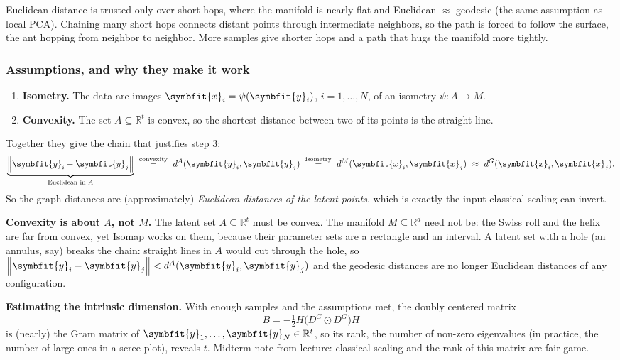 \documentclass[11pt]{article}
\newcommand{\bm}[1]{\symbfit{#1}}
\newcommand{\R}{\mathbb{R}}
\newcommand{\vx}{\bm{x}}
\newcommand{\norm}[1]{\left\lVert #1\right\rVert}
\newcommand{\had}{\odot}
\begin{document}
\begin{intuition}
Euclidean distance is trusted only over short hops, where the manifold is nearly flat and Euclidean $\approx$ geodesic
(the same assumption as local PCA). Chaining many short hops connects distant points through intermediate
neighbors, so the path is forced to follow the surface, the ant hopping from neighbor to neighbor. More samples
give shorter hops and a path that hugs the manifold more tightly.
\end{intuition}

\subsubsection*{Assumptions, and why they make it work}

\begin{enumerate}[label=\arabic*)]
\item \textbf{Isometry.} The data are images $\vx_i=\psi(\bm y_i)$, $i=1,\dots,N$, of an isometry $\psi:A\to M$.
\item \textbf{Convexity.} The set $A\subseteq\R^t$ is convex, so the shortest distance between two of its points is the straight line.
\end{enumerate}
Together they give the chain that justifies step 3:
\[
\underbrace{\norm{\bm y_i-\bm y_j}}_{\text{Euclidean in }A}\ \overset{\text{convexity}}{=}\ d^A(\bm y_i,\bm y_j)\ \overset{\text{isometry}}{=}\ d^M(\vx_i,\vx_j)\ \approx\ d^G(\vx_i,\vx_j) .
\]
So the graph distances are (approximately) \emph{Euclidean distances of the latent points}, which is exactly the input classical
scaling can invert.

\begin{careful}
\textbf{Convexity is about $A$, not $M$.} The latent set $A\subseteq\R^t$ must be convex. The manifold $M\subseteq\R^d$ need not be: the Swiss
roll and the helix are far from convex, yet Isomap works on them, because their parameter sets are a rectangle and an
interval. A latent set with a hole (an annulus, say) breaks the chain: straight lines in $A$ would cut through the
hole, so $\norm{\bm y_i-\bm y_j}<d^A(\bm y_i,\bm y_j)$ and the geodesic distances are no longer Euclidean distances of any configuration.
\end{careful}

\textbf{Estimating the intrinsic dimension.} With enough samples and the assumptions met, the doubly centered matrix
\[
B=-\tfrac12H\big(D^G\had D^G\big)H
\]
is (nearly) the Gram matrix of $\bm y_1,\dots,\bm y_N\in\R^t$, so its rank, the number of non-zero eigenvalues (in practice, the number of large
ones in a scree plot), reveals $t$. Midterm note from lecture: classical scaling and the rank of this matrix are fair game.
\end{document}
